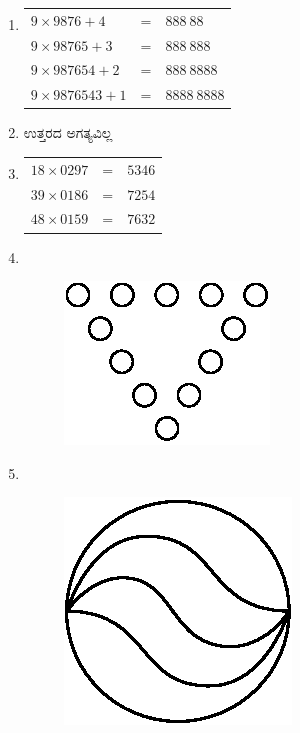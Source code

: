 \begin{enumerate}
\item 
\begin{tabular}[t]{lll}
$9\times 9876 + 4$ & = & $888~88$\\
$9\times 98765 + 3$ & = & $888~888$\\
$9\times 987654 + 2$ & = & $888~8888$\\
$9\times 9876543 + 1$ & = & $8888~8888$\\
\end{tabular}

\item ಉತ್ತರದ ಅಗತ್ಯವಿಲ್ಲ 

\item 
\begin{tabular}[t]{lll}
$18\times 0297$ & = & $5346$\\
$39\times 0186$ & = & $7254$\\
$48\times 0159$ & = & $7632$
\end{tabular}

\item 
~

\begin{figure}[H]
\centering
\includegraphics{images/chap10/ans17.eps}
\end{figure}

\item 
~

\begin{figure}[H]
\centering
\includegraphics{images/chap10/ans18.eps}
\end{figure}


\end{enumerate}
